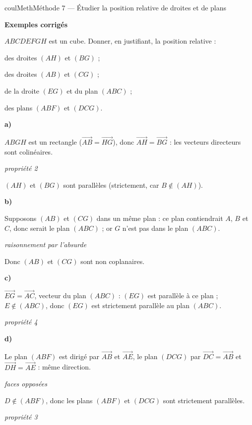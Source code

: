 \documentclass[11pt,a4paper]{article}
\makeatletter
\newcommand{\vect}[1]{\overrightarrow{#1}}
\newcounter{lycee@signet}
\newcommand{\signet}[3][]{\stepcounter{lycee@signet}%
  \edef\lycee@dest{\if\relax\detokenize{#1}\relax
    signet.\arabic{lycee@signet}\else#1\fi}%
  \hypertarget{\lycee@dest}{}\bookmark[level=#2,dest=\lycee@dest]{#3}}
\newcommand{\res}[1]{#1}
\newcounter{methode}
\newenvironment{methodebox}[1][Méthode]{\stepcounter{methode}%
  \begin{boitecours}[phantom={\signet[methode-\arabic{methode}]{2}{#1}}]{coulMeth}{#1}}%
  {\end{boitecours}}
\newcommand{\etape}[1]{\par\smallskip\textbf{\color{coulMeth}#1}\par\nobreak\smallskip}
\newcommand{\explique}[2]{\par\smallskip\noindent
  \begin{minipage}[t]{0.57\linewidth}\raggedright #1\end{minipage}\hfill
  \begin{minipage}[t]{0.40\linewidth}\raggedright\leavevmode
    {\small\itshape\color{black!60}#2}\end{minipage}\par}
\newcommand{\cas}[1]{\par\smallskip\noindent\textbf{\color{coulExo}#1}\vadjust{\nobreak}}
\newenvironment{correction}{\par}{\par}
\newcommand{\etapeexemples}{\etape{Exemples corrigés}}
\makeatother
\begin{document}
\begin{methodebox}[Méthode 7 --- Étudier la position relative de droites et de plans]
\etapeexemples
\begin{minipage}[t]{0.6\linewidth}\raggedright
$ABCDEFGH$ est un cube. Donner, en justifiant, la position relative :
\begin{questions}[label=\alph*)]
  \item des droites $(AH)$ et $(BG)$ ;
  \item des droites $(AB)$ et $(CG)$ ;
  \item de la droite $(EG)$ et du plan $(ABC)$ ;
  \item des plans $(ABF)$ et $(DCG)$.
\end{questions}
\end{minipage}\hfill
\begin{minipage}[t]{0.36\linewidth}\centering\vspace{-4pt}
\end{minipage}
\begin{correction}
\cas{a)}
\explique{$ABGH$ est un rectangle ($\vect{AB}=\vect{HG}$), donc $\vect{AH}=\vect{BG}$ :
les vecteurs directeurs sont colinéaires.}{propriété 2}
\explique{\res{$(AH)$ et $(BG)$ sont parallèles} (strictement, car $B\notin(AH)$).}{}
\cas{b)}
\explique{Supposons $(AB)$ et $(CG)$ dans un même plan : ce plan contiendrait $A$, $B$
et $C$, donc serait le plan $(ABC)$ ; or $G$ n'est pas dans le plan $(ABC)$.}{raisonnement
par l'absurde}
\explique{Donc \res{$(AB)$ et $(CG)$ sont non coplanaires}.}{}
\cas{c)}
\explique{$\vect{EG}=\vect{AC}$, vecteur du plan $(ABC)$ : $(EG)$ est parallèle à ce
plan ; $E\notin(ABC)$, donc \res{$(EG)$ est strictement parallèle au plan
$(ABC)$}.}{propriété 4}
\cas{d)}
\explique{Le plan $(ABF)$ est dirigé par $\vect{AB}$ et $\vect{AE}$, le plan $(DCG)$
par $\vect{DC}=\vect{AB}$ et $\vect{DH}=\vect{AE}$ : même direction.}{faces opposées}
\explique{$D\notin(ABF)$, donc \res{les plans $(ABF)$ et $(DCG)$ sont strictement
parallèles}.}{propriété 3}
\end{correction}


\end{methodebox}
\end{document}
